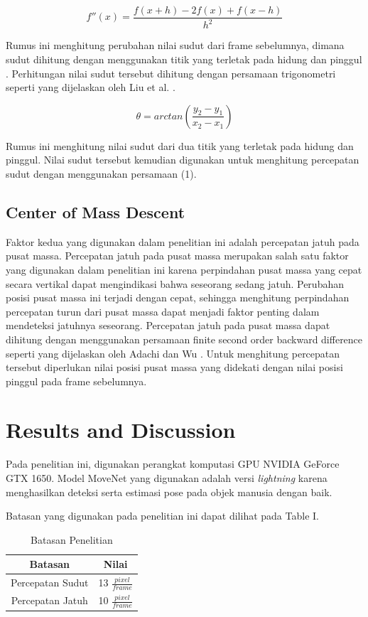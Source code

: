 \documentclass[conference]{IEEEtran}
\begin{document}
\begin{equation}
f''(x)=\frac{f(x+h)-2f(x)+f(x-h)}{h^2}
\end{equation}

Rumus ini menghitung perubahan nilai sudut dari frame sebelumnya, dimana sudut dihitung dengan menggunakan titik yang terletak pada hidung dan pinggul \cite{han2019review}. Perhitungan nilai sudut tersebut dihitung dengan persamaan trigonometri seperti yang dijelaskan oleh Liu et al. \cite{liu2018fall}.

\begin{equation}
\theta=arctan(\frac{y_2-y_1}{x_2-x_1})
\end{equation}

Rumus ini menghitung nilai sudut dari dua titik yang terletak pada hidung dan pinggul. Nilai sudut tersebut kemudian digunakan untuk menghitung percepatan sudut dengan menggunakan persamaan (1).


\subsection{Center of Mass Descent}
Faktor kedua yang digunakan dalam penelitian ini adalah percepatan jatuh pada pusat massa. Percepatan jatuh pada pusat massa merupakan salah satu faktor yang digunakan dalam penelitian ini karena perpindahan pusat massa yang cepat secara vertikal dapat mengindikasi bahwa seseorang sedang jatuh. Perubahan posisi pusat massa ini terjadi dengan cepat, sehingga menghitung perpindahan percepatan turun dari pusat massa dapat menjadi faktor penting dalam mendeteksi jatuhnya seseorang. Percepatan jatuh pada pusat massa dapat dihitung dengan menggunakan persamaan finite second order backward difference seperti yang dijelaskan oleh Adachi dan Wu \cite{adachi2007fall}. Untuk menghitung percepatan tersebut diperlukan nilai posisi pusat massa yang didekati dengan nilai posisi pinggul pada frame sebelumnya.


\section{Results and Discussion}
Pada penelitian ini, digunakan perangkat komputasi GPU NVIDIA GeForce GTX 1650. Model MoveNet yang digunakan adalah versi \textit{lightning} karena menghasilkan deteksi serta estimasi pose pada objek manusia dengan baik.

Batasan yang digunakan pada penelitian ini dapat dilihat pada Table I.

\begin{table}[htbp]
\caption{Batasan Penelitian}
\begin{center}
\begin{tabular}{|c|c|}
\hline
\textbf{Batasan} & \textbf{Nilai} \\
\hline
Percepatan Sudut & 13 $\frac{pixel}{frame}$\\
\hline
Percepatan Jatuh & 10 $\frac{pixel}{frame}$\\
\hline
\end{tabular}
\label{tab1}
\end{center}
\end{table}
\end{document}
